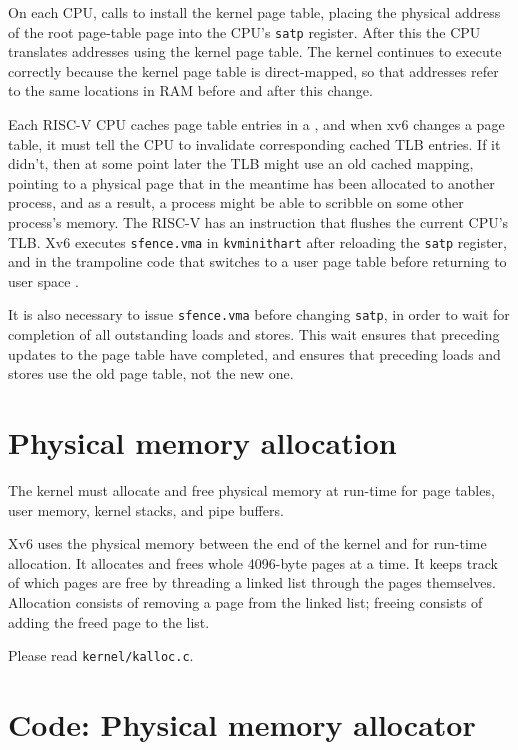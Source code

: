 On each CPU,
calls
to install the kernel page table,
placing
the physical address of the root page-table page
into the CPU's 
\texttt{satp}
register.
After this the CPU translates addresses using the kernel
page table. The kernel continues to execute correctly
because the kernel page table is direct-mapped, so that
addresses refer to the same locations in RAM before
and after this change.

Each RISC-V CPU caches page table entries in a
, and when xv6 changes
a page table, it must tell the CPU to invalidate corresponding
cached TLB entries.  If it didn't,
then at some point later the TLB might
use an old cached mapping, pointing to a physical page that in the meantime
has been allocated to another process, and as a result, a process
might be able to scribble on some other process's memory.  The RISC-V
has an instruction  that flushes
the current CPU's TLB.
Xv6 executes {\tt sfence.vma} in {\tt kvminithart}  after reloading the 
\texttt{satp} register, and in the trampoline code that
switches to a user page table before returning to user space
.

It is also necessary to issue \texttt{sfence.vma} before changing
\texttt{satp}, in order to wait for completion of all outstanding loads and
stores. This wait ensures that preceding updates to the page table have
completed, and ensures that preceding loads and stores use the old
page table, not the new one.

\section{Physical memory allocation}

The kernel must allocate and free physical memory at run-time for
page tables,
user memory,
kernel stacks,
and pipe buffers.

Xv6 uses the physical memory between the end of the kernel and
for run-time allocation. It allocates and frees whole 4096-byte pages
at a time. It keeps track of which pages are free by threading a
linked list through the pages themselves. Allocation consists of
removing a page from the linked list; freeing consists of adding the
freed page to the list.

Please read {\tt kernel/kalloc.c}.

\section{Code: Physical memory allocator}

